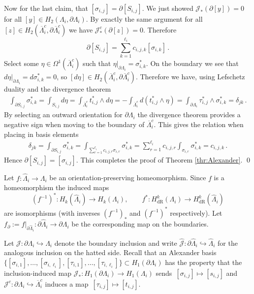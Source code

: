 \documentclass[11pt]{article}
\theoremstyle{plain}
\theoremstyle{definition}
\theoremstyle{remark}
\newcommand{\ST}{\Lambda}
\begin{document}
Now for the last claim, that \([\sigma_{i,j}] = \partial [S_{i,j}]\). We just showed \(\mathcal{J}_*(\partial [y])=0\) for all \([y] \in H_2( \ST_i, \partial \ST_i) \). By exactly the same argument for all \([z] \in H_2 ( \overline{\ST}_i^c ,  \partial \overline{\ST}_i^c )\) we have \(\mathcal{J}^c_*(\partial [z])=0\). Therefore 
\[\partial [S_{i,j}] = \sum_{k=1}^{\ell_i} c_{i,j,k} [\sigma_{i,k}] \, . \]
Select some \(\eta \in \Omega^1(\overline{\ST}^c_i)\) such that \(\eta |_{\partial \ST_i} = \sigma_{i,k}^*\). On the boundary we see that \(d\eta |_{\partial \ST_i} = d \sigma_{i,k}^* = 0\), so \([d\eta] \in H_2(\overline{\ST}^c_i, \partial \overline{\ST}^c_i ) \). Therefore we have, using Lefschetz duality and the divergence theorem 
\begin{align*}
    \int_{\partial S_{i,j}} \sigma_{i,k}^* =  \int_{S_{i,j}}  d\eta = \int_{\overline{\ST}^c_i} t_{i,j}^* \wedge d\eta  = - \int_{\overline{\ST}^c_i} d (t_{i,j}^* \wedge \eta)  
    =    \int_{\partial \ST_i} \tau_{i,j}^* \wedge \sigma_{i,k}^* = \delta_{jk} \, . 
\end{align*}
By selecting an outward orientation for \(\partial \ST_i\) the divergence theorem provides a negative sign when moving to the boundary of \(\overline{\ST}^c_i\). This gives the relation when placing in basis elements
\begin{align*}
    \delta_{jk} = \int_{\partial S_{i,j} }  \sigma_{i,k}^*
    = \int_{ \sum_{r=1}^{\ell_i}  c_{i,j,r} \sigma_{i,r} }  \sigma_{i,k}^*
    = \sum_{r=1}^{\ell_i}  c_{i,j,r}  \int_{ \sigma_{i,r} }  \sigma_{i,k}^*
    =   c_{i,j,k} \, .
\end{align*}
Hence \( \partial [S_{i,j}] =  [\sigma_{i,j}]  \). This completes the proof of Theorem \ref{thr:Alexander}. \qed



Let \(f:\widehat{\ST}_i \to \ST_i\) be an orientation-preserving homeomorphism. Since \(f\) is a homeomorphism the induced maps
\[
(f^{-1})^*:H_k(\widehat{\ST}_i) \to H_k(\ST_i), \qquad
f^*:H^k_{\mathrm{dR}}(\ST_i) \to H^k_{\mathrm{dR}}(\widehat{\ST}_i)
\]
are isomorphisms (with inverses \((f^{-1})_*\) and \((f^{-1})^*\) respectively). Let \(f_\partial:=f\big|_{\partial\widehat{\ST}_i}:\partial\widehat{\ST}_i\to\partial\ST_i\) be the corresponding map on the boundaries. 

Let \(\mathcal{J}:\partial \ST_i \hookrightarrow \ST_i\) denote the boundary inclusion and write \(\widehat{\mathcal{J}}:\partial\widehat{\ST}_i\hookrightarrow\widehat{\ST}_i\) for the analogous inclusion on the hatted side. Recall that an Alexander basis
\(\{[\sigma_{i,1}],\dots,[\sigma_{i,\ell_i}],[\tau_{i,1}],\dots,[\tau_{i,\ell_i}]\}\subset H_1(\partial\ST_i)\) has the property that the inclusion-induced map \(\mathcal{J}_*:H_1(\partial\ST_i)\to H_1(\ST_i)\) sends \(\,[\sigma_{i,j}]\mapsto[s_{i,j}]\) and \(\mathcal{J}^c :\partial \ST_i \hookrightarrow \overline{\ST}^c_i\) induces a map \(\,[\tau_{i,j}]\mapsto[t_{i,j}]\).
\end{document}
